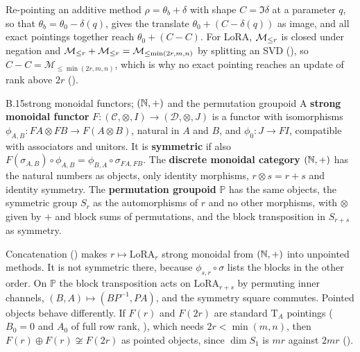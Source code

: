 Re-pointing an additive method $\rho=\theta_b+\delta$ with shape $C=\Im\delta$ at a parameter $q$, so that
$\theta_b=\theta_0-\delta(q)$, gives the translate $\theta_0+(C-\delta(q))$ as image, and all exact pointings together
reach $\theta_0+(C-C)$. For LoRA, $\mathcal{M}_{\le r}$ is closed under negation and $\mathcal{M}_{\le r}+\mathcal{M}_{\le r}=\mathcal M_{\le\min(2r,m,n)}$ by
splitting an SVD (), so $C-C=\mathcal M_{\le\min(2r,m,n)}$, which is why no exact pointing reaches an update
of rank above $2r$ ().


\begin{bgentry}{B.15}{strong monoidal functors; $(\mathbb{N},+)$ and the permutation groupoid}
A \textbf{strong monoidal functor} $F:(\mathcal C,\otimes,I)\to(\mathcal D,\otimes,J)$ is a functor with isomorphisms
$\phi_{A,B}:FA\otimes FB\to F(A\otimes B)$, natural in $A$ and $B$, and $\phi_0:J\to FI$, compatible with associators and
unitors. It is \textbf{symmetric} if also $F(\sigma_{A,B})\circ\phi_{A,B}=\phi_{B,A}\circ\sigma_{FA,FB}$. The
\textbf{discrete monoidal category} $(\mathbb{N},+)$ has the natural numbers as objects, only identity morphisms, $r\otimes s=r+s$
and identity symmetry. The \textbf{permutation groupoid} $\mathbb P$ has the same objects, the symmetric group $S_r$ as
the automorphisms of $r$ and no other morphisms, with $\otimes$ given by $+$ and block sums of permutations, and the block
transposition in $S_{r+s}$ as symmetry.
\end{bgentry}

Concatenation () makes $r\mapsto\mathrm{LoRA}_r$ strong monoidal from $(\mathbb{N},+)$ into unpointed methods. It is
not symmetric there, because $\phi_{s,r}\circ\sigma$ lists the blocks in the other order. On $\mathbb P$ the block
transposition acts on $\mathrm{LoRA}_{r+s}$ by permuting inner channels, $(B,A)\mapsto(BP^{-1},PA)$, and the symmetry
square commutes. Pointed objects behave differently. If $F(r)$ and $F(2r)$ are standard $\mathrm T_A$ pointings
($B_0=0$ and $A_0$ of full row rank, ), which needs $2r<\min(m,n)$, then $F(r)\oplus F(r)\not\cong F(2r)$ as
pointed objects, since $\dim S_1$ is $mr$ against $2mr$ ().


